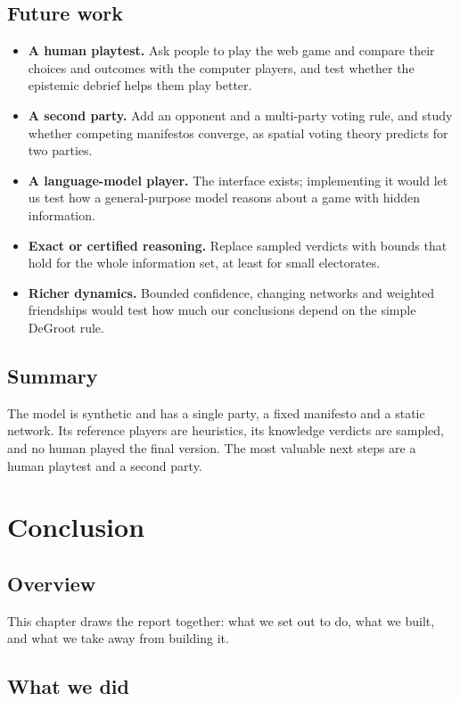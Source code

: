 \documentclass[11pt,a4paper,oneside]{report}
\newcommand{\overviewsection}{\section{Overview}}
\newcommand{\summarysection}{\section{Summary}}
\begin{document}
\section{Future work}

\begin{itemize}
  \item \textbf{A human playtest.} Ask people to play the web game and compare their choices and outcomes
        with the computer players, and test whether the epistemic debrief helps them play better.
  \item \textbf{A second party.} Add an opponent and a multi-party voting rule, and study whether
        competing manifestos converge, as spatial voting theory predicts for two parties.
  \item \textbf{A language-model player.} The interface exists; implementing it would let us test how a
        general-purpose model reasons about a game with hidden information.
  \item \textbf{Exact or certified reasoning.} Replace sampled verdicts with bounds that hold for the whole
        information set, at least for small electorates.
  \item \textbf{Richer dynamics.} Bounded confidence, changing networks and weighted friendships would test
        how much our conclusions depend on the simple DeGroot rule.
\end{itemize}

\summarysection

The model is synthetic and has a single party, a fixed manifesto and a static network. Its reference
players are heuristics, its knowledge verdicts are sampled, and no human played the final version. The
most valuable next steps are a human playtest and a second party.

\chapter{Conclusion}\label{ch:conclusion}

\overviewsection

This chapter draws the report together: what we set out to do, what we built, and what we take away from
building it.

\section{What we did}
\end{document}
